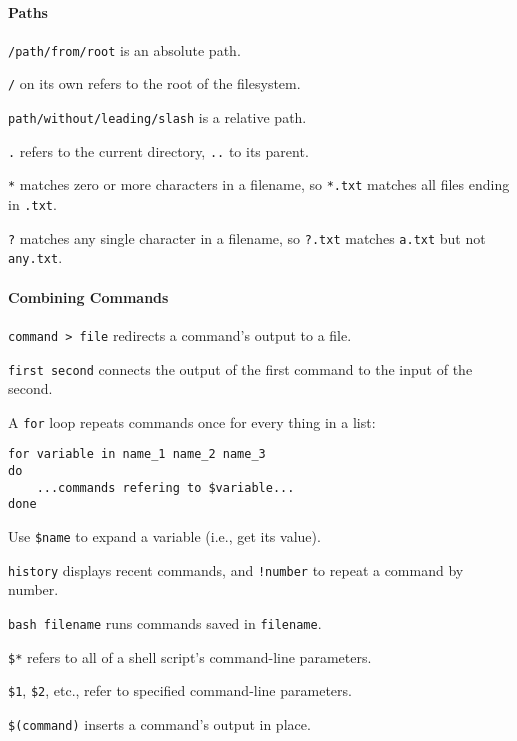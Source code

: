 \documentclass{book}
\begin{document}
\mbox{}\paragraph{Paths}

\begin{swcitemize}
\item
  \texttt{/path/from/root} is an absolute path.
\item
  \texttt{/} on its own refers to the root of the filesystem.
\item
  \texttt{path/without/leading/slash} is a relative path.
\item
  \texttt{.} refers to the current directory, \texttt{..} to its parent.
\item
  \texttt{*} matches zero or more characters in a filename, so
  \texttt{*.txt} matches all files ending in \texttt{.txt}.
\item
  \texttt{?} matches any single character in a filename, so
  \texttt{?.txt} matches \texttt{a.txt} but not \texttt{any.txt}.
\end{swcitemize}

\mbox{}\paragraph{Combining Commands}

\begin{swcitemize}
\item
  \texttt{command \textgreater{} file} redirects a command's output to a
  file.
\item
  \texttt{first \textbar{} second} connects the output of the first
  command to the input of the second.
\item
  A \texttt{for} loop repeats commands once for every thing in a list:

\begin{Verbatim}
for variable in name_1 name_2 name_3
do
    ...commands refering to $variable...
done
\end{Verbatim}
\item
  Use \texttt{\$name} to expand a variable (i.e., get its value).
\item
  \texttt{history} displays recent commands, and \texttt{!number} to
  repeat a command by number.
\item
  \texttt{bash filename} runs commands saved in \texttt{filename}.
\item
  \texttt{\$*} refers to all of a shell script's command-line
  parameters.
\item
  \texttt{\$1}, \texttt{\$2}, etc., refer to specified command-line
  parameters.
\item
  \texttt{\$(command)} inserts a command's output in place.
\end{swcitemize}
\end{document}
